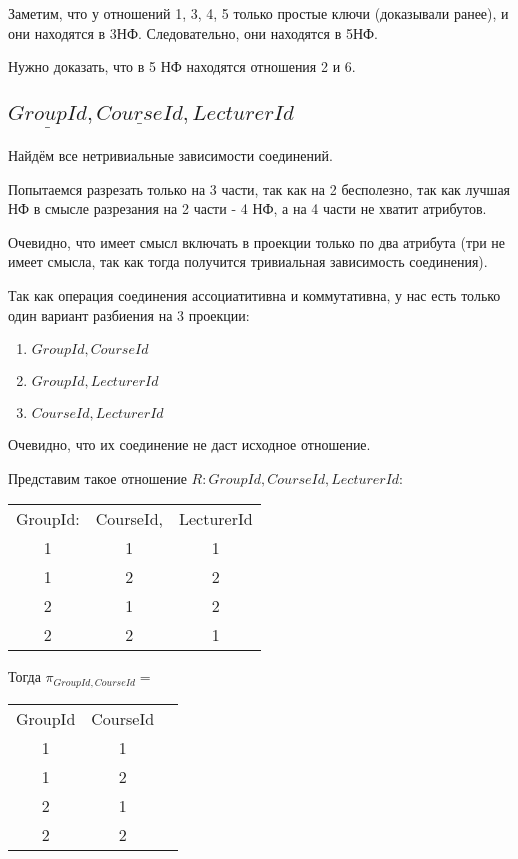 \documentclass{article}
\begin{document}
	Заметим, что у отношений 1, 3, 4, 5 только простые ключи (доказывали ранее), и они находятся в 3НФ. Следовательно, они находятся в 5НФ.
	
	Нужно доказать, что в 5 НФ находятся отношения 2 и 6.
	
	\subsection{$\underline{GroupId}, \underline{CourseId}, LecturerId$}

	Найдём все нетривиальные зависимости соединений.
	
	Попытаемся разрезать только на 3 части, так как на 2 бесполезно, так как лучшая НФ в смысле разрезания на 2 части - 4 НФ, а на 4 части не хватит атрибутов.
	
	Очевидно, что имеет смысл включать в проекции только по два атрибута (три не имеет смысла, так как тогда получится тривиальная зависимость соединения).
	
	Так как операция соединения ассоциатитивна и коммутативна, у нас есть только один вариант разбиения на 3 проекции:
	
	\begin{enumerate}
		\item $GroupId, CourseId$
		\item $GroupId, LecturerId$
		\item $CourseId, LecturerId$
	\end{enumerate}

	Очевидно, что их соединение не даст исходное отношение. 
	
	Представим такое отношение $R: GroupId, CourseId, LecturerId$:
	
	\begin{center}
		\begin{tabular}{ccc}
			GroupId: & CourseId,& LecturerId \\
			1 & 1 & 1\\ 
			1 & 2& 2 \\
			2 & 1 & 2\\
			2 & 2 & 1 \\
		\end{tabular}
	\end{center}

	Тогда $\pi_{GroupId, CourseId} = $
	
		\begin{center}
		\begin{tabular}{ccc}
			GroupId & CourseId \\
			1 & 1\\
			1 & 2 \\
			2 & 1 \\
			2 & 2 \\
		\end{tabular}
	\end{center}
\end{document}
